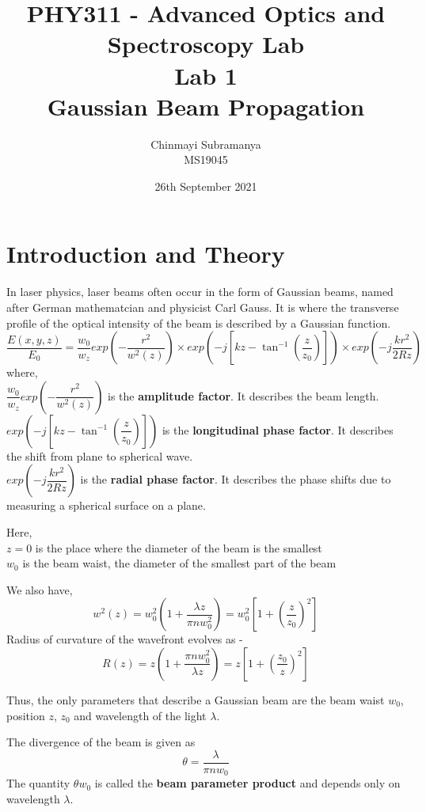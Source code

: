 \documentclass{article}[11pt]
\title{\bf{PHY311 - Advanced Optics and Spectroscopy Lab \\ Lab 1 \\ Gaussian Beam Propagation}}
\author{Chinmayi Subramanya \\ MS19045}
\date{26th September 2021}
\begin{document}
\maketitle

\section{Introduction and Theory}
In laser physics, laser beams often occur in the form of Gaussian beams, named after German mathematcian and physicist Carl Gauss. It is where the transverse profile of the optical intensity of the beam is described by a Gaussian function. 
$$\frac{E(x,y,z)}{E_0} = \frac{w_0}{w_z} exp \left( - \frac{r^2}{w^2 (z)} \right) \times exp \left( -j \left[ kz - \tan^{-1} \left( \frac{z}{z_0} \right) \right] \right) \times exp \left( -j \frac{kr^2}{2Rz} \right)$$
where,
\medskip
\\
$\dfrac{w_0}{w_z} exp \left( - \dfrac{r^2}{w^2 (z)} \right)$ is the {\bf amplitude factor}. It describes the beam length.
\medskip
\\
$exp \left( -j \left[ kz - \tan^{-1} \left( \dfrac{z}{z_0} \right) \right] \right)$ is the {\bf longitudinal phase factor}. It describes the shift from plane to spherical wave.
\medskip
\\
$exp \left( -j \dfrac{kr^2}{2Rz} \right)$ is the {\bf radial phase factor}. It describes the phase shifts due to measuring a spherical surface on a plane. 

\bigskip
\noindent
Here, 
\\
$z = 0$ is the place where the diameter of the beam is the smallest
\\
$w_0$ is the beam waist, the diameter of the smallest part of the beam

\bigskip
\noindent
We also have,
$$w^2 (z) = w_0^2 \left( 1 + \frac{\lambda z}{\pi n w_0^2} \right) = w_0^2 \left[ 1 + \left( \frac{z}{z_0} \right)^2 \right]$$
Radius of curvature of the wavefront evolves as -
$$R(z) = z \left( 1 + \frac{\pi n w_0^2}{\lambda z} \right) = z \left[ 1 + \left( \frac{z_0}{z} \right)^2 \right]$$

\medskip
\noindent
Thus, the only parameters that describe a Gaussian beam are the beam waist $w_0$, position $z$, $z_0$ and wavelength of the light $\lambda$. 

\medskip
\noindent
The divergence of the beam is given as
$$\theta = \frac{\lambda}{\pi n w_0}$$
The quantity $\theta w_0$ is called the {\bf beam parameter product} and depends only on wavelength $\lambda$.
 
\end{document}
